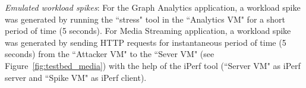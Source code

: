 \textit{Emulated workload spikes}: For the Graph Analytics application, a workload spike was generated by running the ``stress" tool in the ``Analytics VM" for a short period of time (5 seconds). For Media Streaming application, a workload spike was generated by sending HTTP requests for instantaneous period of time (5 seconds) from the ``Attacker VM" to the ``Sever VM" (see Figure~\ref{fig:testbed_media}) with the help of the iPerf tool (``Server VM" as iPerf server and ``Spike VM" as iPerf client).


